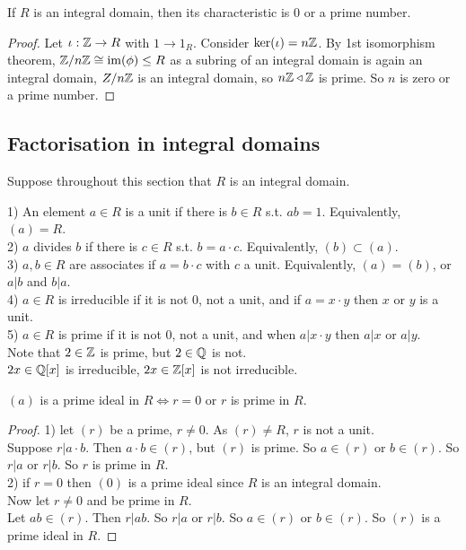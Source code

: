 \documentclass[a4paper]{article}
\begin{document}
\begin{lemma}
If $R$ is an integral domain, then its characteristic is $0$ or a prime number.
\begin{proof}
Let $\iota:\mathbb{Z} \to R$ with $1 \to 1_R$. Consider $\ker(\iota) = n\mathbb{Z}$. By 1st isomorphism theorem, $\mathbb{Z} / n\mathbb{Z} \cong \operatorname{im}(\phi) \leq R$ as a subring of an integral domain is again an integral domain, $Z/n\mathbb{Z}$ is an integral domain, so $n\mathbb{Z} \triangleleft \mathbb{Z}$ is prime. So $n$ is zero or a prime number.
\end{proof}
\end{lemma}

\subsection{Factorisation in integral domains}
Suppose throughout this section that $R$ is an integral domain.\\
\begin{defi}
1) An element $a\in R$ is a unit if there is $b\in R$ s.t. $ab=1$. Equivalently, $\left(a\right)=R$.\\
2) $a$ divides $b$ if there is $c\in R$ s.t. $b=a\cdot c$. Equivalently, $\left(b\right) \subset \left(a\right)$.\\
3) $a,b\in R$ are associates if $a=b\cdot c$ with $c$ a unit. Equivalently, $\left(a\right)=\left(b\right)$, or $a|b$ and $b|a$.\\
4) $a\in R$ is irreducible if it is not 0, not a unit, and if $a=x\cdot y$ then $x$ or $y$ is a unit.\\
5) $a\in R$ is prime if it is not 0, not a unit, and when $a|x\cdot y$ then $a|x$ or $a|y$.\\

Note that $2\in \mathbb{Z}$ is prime, but $2\in \mathbb{Q}$ is not.\\
$2x\in \mathbb{Q}[x]$ is irreducible, $2x\in \mathbb{Z}[x]$ is not irreducible.
\end{defi}

\begin{lemma}
$\left(a\right)$ is a prime ideal in $R \iff r=0$ or $r$ is prime in $R$.
\begin{proof}
1) let $\left(r\right)$ be a prime, $r\neq 0$. As $\left(r\right) \neq R$, $r$ is not a unit.\\
Suppose $r|a\cdot b$. Then $a\cdot b\in \left(r\right)$, but $\left(r\right)$ is prime. So $a\in\left(r\right)$ or $b\in\left(r\right)$. So $r|a$ or $r|b$. So $r$ is prime in $R$.\\
2) if $r=0$ then $(0)$ is a prime ideal since $R$ is an integral domain.\\
Now let $r\neq 0$ and be prime in $R$.\\
Let $ab\in\left(r\right)$. Then $r|ab$. So $r|a$ or $r|b$. So $a\in\left(r\right)$ or $b\in\left(r\right)$. So $\left(r\right)$ is a prime ideal in $R$.
\end{proof}
\end{lemma}
\end{document}
